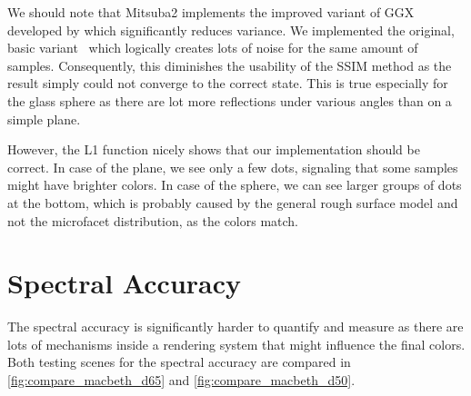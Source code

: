 We should note that Mitsuba2 implements the improved variant of GGX developed by \citet{heitz2018sampling} which significantly reduces variance. We implemented the original, basic variant~\cite{walter2007microfacet} which logically creates lots of noise for the same amount of samples. Consequently, this diminishes the usability of the SSIM method as the result simply could not converge to the correct state. This is true especially for the glass sphere as there are lot more reflections under various angles than on a simple plane.

However, the L1 function nicely shows that our implementation should be correct. In case of the plane, we see only a few dots, signaling that some samples might have brighter colors. In case of the sphere, we can see larger groups of dots at the bottom, which is probably caused by the general rough surface model and not the microfacet distribution, as the colors match.

\section{Spectral Accuracy}

The spectral accuracy is significantly harder to quantify and measure as there are lots of mechanisms inside a rendering system that might influence the final colors. Both testing scenes for the spectral accuracy are compared in \autoref{fig:compare_macbeth_d65} and \autoref{fig:compare_macbeth_d50}.


